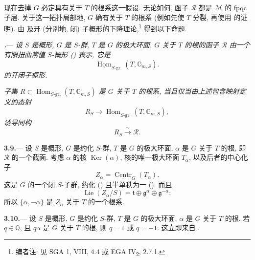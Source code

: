 现在去掉 \(G\) 必定具有关于 \(T\) 的根系这一假设. 无论如何, 函子 \(\mathcal R\) 都是 \(\mathcal M\) 的 fpqc 子层. 关于这一拓扑局部地, \(G\) 确有关于 \(T\) 的根系 (例如先使 \(T\) 分裂, 再使用 的证明). 由 及开 (分别地, 闭) 子概形的下降理论,\footnote{编者注: 见 SGA 1, VIII, 4.4 或 EGA IV\textsubscript{2}, 2.7.1.}
得到以下命题.

\par\medskip\noindent
{}\textbf{\textit{.}}---
\textit{设 \(S\) 是概形, \(G\) 是 \(S\)-群, \(T\) 是 \(G\) 的极大环面. \(G\) 关于 \(T\) 的根的函子 \(\mathcal R\) 由一个有限扭曲常值 \(S\)-概形 \textup{()} 表示, 它是}
\[
  \underline{\operatorname{Hom}}_{S\text{-gr.}}
  (T,\mathbb G_{m,S}).
\]
\textit{的开闭子概形.}

\textit{子集 \(R\subset\operatorname{Hom}_{S\text{-gr.}}(T,\mathbb G_{m,S})\) 是 \(G\) 关于 \(T\) 的根系, 当且仅当由上述包含映射定义的态射}
\[
  R_S
  \longrightarrow
  \underline{\operatorname{Hom}}_{S\text{-gr.}}
  (T,\mathbb G_{m,S}),
\]
\textit{诱导同构}
\[
  R_S\xrightarrow{\ \sim\ }\mathcal R.
\]

\par\medskip\noindent
\textbf{3.9.}---
设 \(S\) 是概形, \(G\) 是约化 \(S\)-群, \(T\) 是 \(G\) 的极大环面, \(\alpha\) 是 \(G\) 关于 \(T\) 的根, 即 \(\mathcal R\) 的一个截面. 考虑 \(\alpha\) 的核 \(\operatorname{Ker}(\alpha)\), 核的唯一极大环面 \(T_\alpha\), 以及后者的中心化子
\[
  Z_\alpha=\underline{\operatorname{Centr}}_G(T_\alpha).
\]
这是 \(G\) 的一个闭 \(S\)-子群, 约化 () 且半单秩为一 (). 而且,
\[
  \operatorname{Lie}(Z_\alpha/S)
  =
  \mathfrak t
  \oplus\mathfrak g^\alpha
  \oplus\mathfrak g^{-\alpha};
\]
所以 \(\{\alpha,-\alpha\}\) 是 \(Z_\alpha\) 关于 \(T\) 的一个根系.

\par\medskip\noindent
\textbf{3.10.}---
设 \(S\) 是概形, \(G\) 是约化 \(S\)-群, \(T\) 是 \(G\) 的极大环面, \(\alpha\) 是 \(G\) 关于 \(T\) 的根. 若 \(q\in\mathbb Q\), 且 \(q\alpha\) 是 \(G\) 关于 \(T\) 的根, 则 \(q=1\) 或 \(q=-1\). 这立即来自 .

